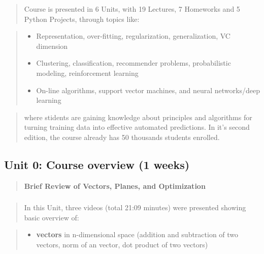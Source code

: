 \documentclass[]{article}
\providecommand{\tightlist}{%
  \setlength{\itemsep}{0pt}\setlength{\parskip}{0pt}}
\begin{document}
\begin{quote}
Course is presented in 6 Units, with 19 Lectures, 7 Homeworks and 5
Python Projects, through topics like:
\end{quote}

\begin{quote}
\begin{itemize}
\tightlist
\item
  Representation, over-fitting, regularization, generalization, VC
  dimension
\item
  Clustering, classification, recommender problems, probabilistic
  modeling, reinforcement learning
\item
  On-line algorithms, support vector machines, and neural networks/deep
  learning
\end{itemize}
\end{quote}

\begin{quote}
where stidents are gaining knowledge about principles and algorithms for
turning training data into effective automated predictions. In it's
second edition, the course already has 50 thousands students enrolled.
\end{quote}

\newpage

\hypertarget{unit-0-course-overview-1-weeks}{%
\subsection{Unit 0: Course overview (1
weeks)}\label{unit-0-course-overview-1-weeks}}

\begin{quote}
\textbf{Brief Review of Vectors, Planes, and Optimization }
\end{quote}

\hypertarget{section-2}{%
\subsubsection{}\label{section-2}}

\begin{quote}
In this Unit, three videos (total 21:09 minutes) were presented showing
basic overview of:
\end{quote}

\begin{quote}
\begin{itemize}
\tightlist
\item
  \textbf{vectors} in n-dimensional space (addition and subtraction of
  two vectors, norm of an vector, dot product of two vectors)
\end{itemize}
\end{quote}
\end{document}
